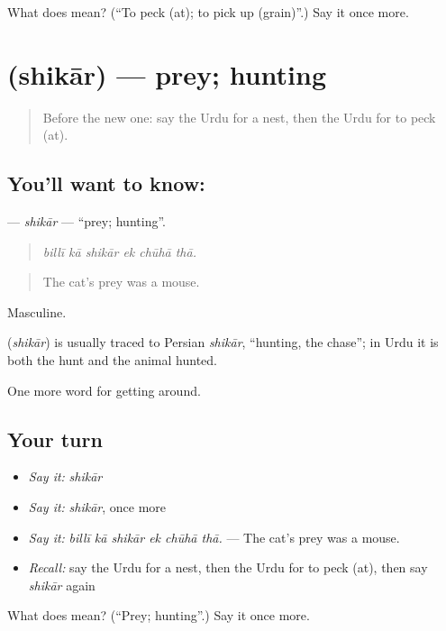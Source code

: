 \begin{tcolorbox}[breakable,colback=teal!4,colframe=teal!35!black,title={Before you move on}]
What does  mean? (\textquotedblleft{}To peck (at); to pick up (grain)\textquotedblright{}.) Say it once more.
\end{tcolorbox}
\section[\texorpdfstring{\ur{شکار} (shikār)}{شکار (shikār)}]{ (shikār) — prey; hunting}

\label{lesson:UR-C438-shikar}



\begin{quote}
Before the new one: say the Urdu for a nest, then the Urdu for to peck (at).
\end{quote}

\subsection*{You'll want to know: }
\textbf{} — \emph{shikār} — \textquotedblleft{}prey; hunting\textquotedblright{}.

\begin{quote}
     
\end{quote}

\begin{quote}
\emph{billī kā shikār ek chūhā thā.}
\end{quote}

\begin{quote}
The cat's prey was a mouse.
\end{quote}

Masculine.

\begin{cousinweb}
\textbf{} (\emph{shikār}) is usually traced to Persian \emph{shikār}, \textquotedblleft{}hunting, the chase\textquotedblright{}; in Urdu it is both the hunt and the animal hunted.
\end{cousinweb}

\begin{grammarlens}[title={What you've built}]
One more word for getting around.
\end{grammarlens}

\subsection*{Your turn}
\begin{itemize}
\raggedright
  \item \emph{Say it:} \emph{shikār}
  \item \emph{Say it:} \emph{shikār}, once more
  \item \emph{Say it:} \emph{billī kā shikār ek chūhā thā.} — The cat's prey was a mouse.
  \item \emph{Recall:} say the Urdu for a nest, then the Urdu for to peck (at), then say \emph{shikār} again
\end{itemize}

\begin{tcolorbox}[breakable,colback=teal!4,colframe=teal!35!black,title={Before you move on}]
What does  mean? (\textquotedblleft{}Prey; hunting\textquotedblright{}.) Say it once more.
\end{tcolorbox}

